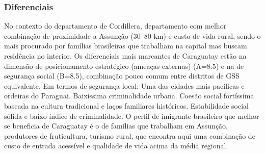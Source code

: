 \subsubsection*{Diferenciais}\label{dif-caraguatay-0305}
No contexto do departamento de Cordillera, departamento com melhor combinação de proximidade a Assunção (30–80 km) e custo de vida rural, sendo o mais procurado por famílias brasileiras que trabalham na capital mas buscam residência no interior. Os diferenciais mais marcantes de Caraguatay estão na dimensão de posicionamento estratégico (ameaças externas) (A=8.5) e na de segurança social (B=8.5), combinação pouco comum entre distritos de GSS equivalente. Em termos de segurança local: Uma das cidades mais pacíficas e ordeiras do Paraguai. Baixíssima criminalidade urbana. Coesão social fortíssima baseada na cultura tradicional e laços familiares históricos. Estabilidade social sólida e baixo índice de criminalidade. O perfil de imigrante brasileiro que melhor se beneficia de Caraguatay é o de famílias que trabalham em Assunção, produtores de fruticultura, turismo rural, que encontra aqui uma combinação de custo de entrada acessível e qualidade de vida acima da média regional.
